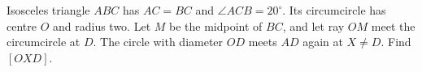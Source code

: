 Isosceles triangle $ABC$ has $AC=BC$ and $\angle ACB=20^\circ$. Its circumcircle has centre $O$ and radius two. Let $M$ be the midpoint of $BC$, and let ray $OM$ meet the circumcircle at $D$. The circle with diameter $OD$ meets $AD$ again at $X\ne D$. Find $[OXD]$.
